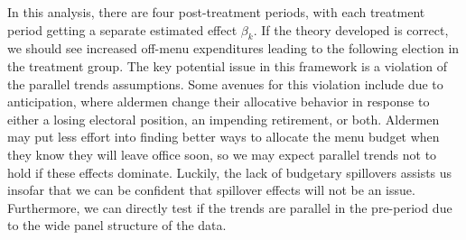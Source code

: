 In this analysis, there are four post-treatment periods, with each treatment period getting a separate estimated effect $\beta_k$. 
If the theory developed is correct, we should see increased off-menu expenditures leading to the following election in the treatment group. 
The key potential issue in this framework is a violation of the parallel trends assumptions. 
Some avenues for this violation include due to anticipation, where aldermen change their allocative behavior in response to either a losing electoral position, an impending retirement, or both. 
Aldermen may put less effort into finding better ways to allocate the menu budget when they know they will leave office soon, so we may expect parallel trends not to hold if these effects dominate. 
Luckily, the lack of budgetary spillovers assists us insofar that we can be confident that spillover effects will not be an issue. 
Furthermore, we can directly test if the trends are parallel in the pre-period due to the wide panel structure of the data.
